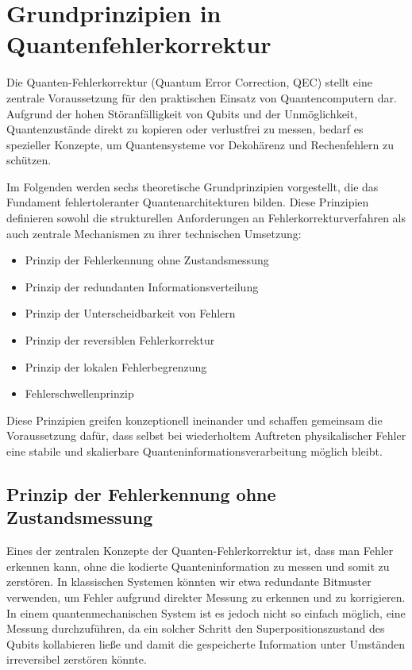\section{Grundprinzipien in Quantenfehlerkorrektur}\label{chap:QEC2}
Die Quanten-Fehlerkorrektur (Quantum Error Correction, QEC) stellt eine zentrale Voraussetzung für den praktischen Einsatz von Quantencomputern dar. Aufgrund der hohen Störanfälligkeit von Qubits und der Unmöglichkeit, Quantenzustände direkt zu kopieren oder verlustfrei zu messen, bedarf es spezieller Konzepte, um Quantensysteme vor Dekohärenz und Rechenfehlern zu schützen.

Im Folgenden werden sechs theoretische Grundprinzipien vorgestellt, die das Fundament fehlertoleranter Quantenarchitekturen bilden. Diese Prinzipien definieren sowohl die strukturellen Anforderungen an Fehlerkorrekturverfahren als auch zentrale Mechanismen zu ihrer technischen Umsetzung:

\begin{itemize}
    \item Prinzip der Fehlerkennung ohne Zustandsmessung
    \item Prinzip der redundanten Informationsverteilung
    \item Prinzip der Unterscheidbarkeit von Fehlern
    \item Prinzip der reversiblen Fehlerkorrektur
    \item Prinzip der lokalen Fehlerbegrenzung
    \item Fehlerschwellenprinzip
\end{itemize}

Diese Prinzipien greifen konzeptionell ineinander und schaffen gemeinsam die Voraussetzung dafür, dass selbst bei wiederholtem Auftreten physikalischer Fehler eine stabile und skalierbare Quanteninformationsverarbeitung möglich bleibt.

\subsection{Prinzip der Fehlerkennung ohne Zustandsmessung}
Eines der zentralen Konzepte der Quanten-Fehlerkorrektur ist, dass man Fehler erkennen kann, ohne die kodierte Quanteninformation zu messen und somit zu zerstören. In klassischen Systemen könnten wir etwa redundante Bitmuster verwenden, um Fehler aufgrund direkter Messung zu erkennen und zu korrigieren. In einem quantenmechanischen System ist es jedoch nicht so einfach möglich, eine Messung durchzuführen, da ein solcher Schritt den Superpositionszustand des Qubits kollabieren ließe und damit die gespeicherte Information unter Umständen irreversibel zerstören könnte. \cite{nielsen_quantum_2010}

